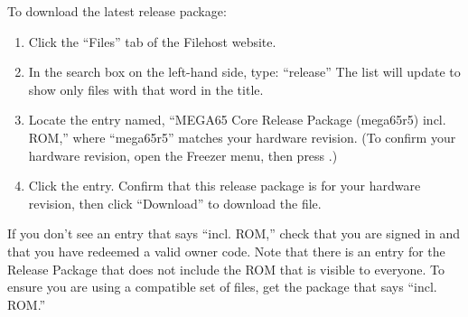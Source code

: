 \begin{center}
\end{center}

To download the latest release package:

\begin{enumerate}
  \item Click the ``Files'' tab of the Filehost website.
  \item In the search box on the left-hand side, type: ``release'' The list will update to show only files with that word in the title.
  \item Locate the entry named, ``MEGA65 Core Release Package (mega65r5) incl. ROM,'' where ``mega65r5'' matches your hardware revision. (To confirm your hardware revision, open the Freezer menu, then press .)
  \item Click the entry. Confirm that this release package is for your hardware revision, then click ``Download'' to download the file.
\end{enumerate}

If you don't see an entry that says ``incl. ROM,'' check that you are signed in and that you have redeemed a valid owner code. Note that there is an entry for the Release Package that does not include the ROM that is visible to everyone. To ensure you are using a compatible set of files, get the package that says ``incl. ROM.''

\begin{center}
\end{center}

